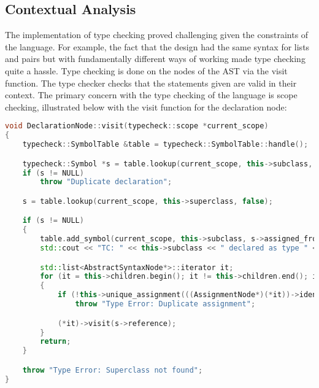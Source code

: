 \subsection{Contextual Analysis}

The implementation of type checking proved challenging given the constraints of the language. For example, the fact that the design had the same syntax for lists and pairs but with fundamentally different ways of working made type checking quite a hassle.
\vspace{10pt}
Type checking is done on the nodes of the AST via the visit function. The type checker checks that the statements given are valid in their context. The primary concern with the type checking of the language is scope checking, illustrated below with the visit function for the declaration node:

\begin{lstlisting}[language = c++]
void DeclarationNode::visit(typecheck::scope *current_scope)
{
	typecheck::SymbolTable &table = typecheck::SymbolTable::handle();

	typecheck::Symbol *s = table.lookup(current_scope, this->subclass, false);
	if (s != NULL)
		throw "Duplicate declaration";

	s = table.lookup(current_scope, this->superclass, false);

	if (s != NULL)
	{
		table.add_symbol(current_scope, this->subclass, s->assigned_from, s->assigns, s->reference);
		std::cout << "TC: " << this->subclass << " declared as type " << this->superclass << std::endl;

		std::list<AbstractSyntaxNode*>::iterator it;
		for (it = this->children.begin(); it != this->children.end(); it++)
		{
			if (!this->unique_assignment(((AssignmentNode*)(*it))->identifier))
				throw "Type Error: Duplicate assignment";

			(*it)->visit(s->reference);
		}
		return;
	}

	throw "Type Error: Superclass not found";
}
\end{lstlisting}

